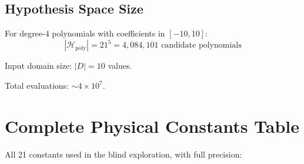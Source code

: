 \documentclass[11pt,a4paper]{article}
\begin{document}
\subsection{Hypothesis Space Size}

For degree-4 polynomials with coefficients in $[-10, 10]$:
\begin{equation}
|\mathcal{H}_{\text{poly}}| = 21^5 = 4,084,101 \text{ candidate polynomials}
\end{equation}

Input domain size: $|D| = 10$ values.

Total evaluations: $\sim 4 \times 10^7$.

\section{Complete Physical Constants Table}

All 21 constants used in the blind exploration, with full precision:
\end{document}
